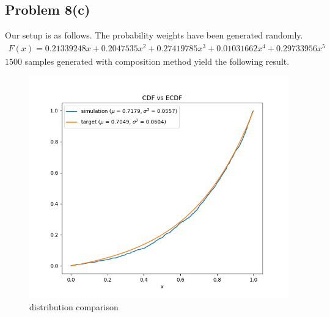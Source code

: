 \documentclass{article}
\begin{document}
\subsection*{Problem 8(c)}
Our setup is as follows. The probability weights have been generated randomly.
\begin{align*}
  F(x) = 0.21339248x + 0.2047535x^2 +  0.27419785x^3 + 0.01031662x^4 + 0.29733956 x^5
\end{align*}
$1500$ samples generated with composition method yield the following result.
\begin{figure}[h!]
    \centering
    \includegraphics[width=\linewidth]{../images/p8c_dist_incomp_1500.png}
    \caption{distribution comparison}
\end{figure}
\newpage
\end{document}
